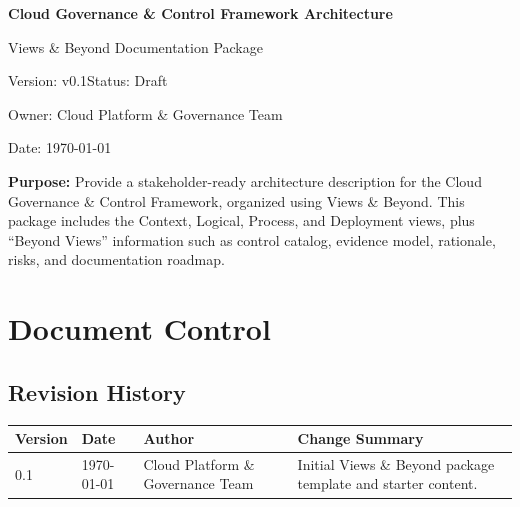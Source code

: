 \documentclass[11pt]{report}
\renewcommand{\DocTitle}{Cloud Governance \& Control Framework Architecture}
\renewcommand{\DocSubtitle}{Views \& Beyond Documentation Package}
\renewcommand{\DocVersion}{v0.1}
\renewcommand{\DocStatus}{Draft}
\renewcommand{\DocOwner}{Cloud Platform \& Governance Team}
\renewcommand{\DocDate}{\today}
\begin{document}
\hypersetup{pageanchor=false}%
\begin{titlepage}
  \centering
  \vspace*{1.5cm}
  {\LARGE \textbf{\DocTitle}\par}
  \vspace{0.5cm}
  {\Large \DocSubtitle\par}
  \vspace{1.0cm}
  {\large Version: \DocVersion \quad \textbar \quad Status: \DocStatus\par}
  \vspace{0.5cm}
  {\large Owner: \DocOwner\par}
  \vspace{0.5cm}
  {\large Date: \DocDate\par}
  \vfill
  \begin{minipage}{0.9\textwidth}
    \small
    \textbf{Purpose:} Provide a stakeholder-ready architecture description for the Cloud Governance \&
    Control Framework, organized using Views \& Beyond. This package includes the Context, Logical,
    Process, and Deployment views, plus “Beyond Views” information such as control catalog, evidence
    model, rationale, risks, and documentation roadmap.
  \end{minipage}
  \vfill
\end{titlepage}\hypersetup{pageanchor=true}

\tableofcontents
\clearpage

\chapter*{Document Control}

\section*{Revision History}

\begin{tabularx}{\textwidth}{@{}l l l >{\raggedright\arraybackslash}X@{}}
\toprule
\textbf{Version} & \textbf{Date} & \textbf{Author} & \textbf{Change Summary} \\
\midrule
0.1 & \DocDate & \DocOwner & Initial Views \& Beyond package template and starter content. \\
\bottomrule
\end{tabularx}
\end{document}
